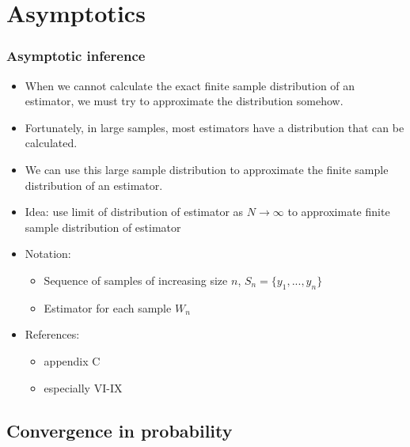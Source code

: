 \section{Asymptotics}
\begin{frame}\frametitle{Asymptotic inference}
  \begin{itemize}
  \item When we cannot calculate the exact finite sample distribution of an
estimator, we must try to approximate the distribution
somehow. 
\item Fortunately, in large samples, most estimators have a
distribution that can be calculated. 
\item We can use this large sample
distribution to approximate the finite sample distribution of an
estimator. 
\framebreak
  \item Idea: use limit of distribution of estimator as $N \to \infty$
    to approximate finite sample distribution of estimator
  \item Notation:
    \begin{itemize}
    \item Sequence of samples of increasing size $n$, $S_n = \{y_1,
      ..., y_n\}$
    \item Estimator for each sample $W_n$
    \end{itemize}
  \item References: 
    \begin{itemize}
    \item \cite{w2013} appendix C
    \item \cite{menzel2009}
      especially VI-IX
    \end{itemize}
  \end{itemize}
\end{frame}

\subsection{Convergence in probability}

